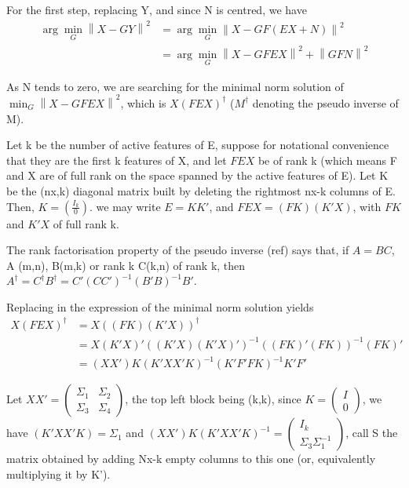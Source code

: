\documentclass{article}
\begin{document}
For the first step, replacing Y, and since N is centred, we have
\begin{equation}
\begin{aligned}
\arg \min_G \left \| X-GY \right \|^2 &= \arg \min_G \left \| X - GF(EX+N)\right\|^2 \\
&{}= \arg \min_G \left \| X-GFEX\right\| ^2  + \left \| GFN\right \| ^2
\end{aligned}
\end{equation}

As N tends to zero, we are searching for the minimal norm solution of $\min_G \left \| X-GFEX\right\| ^2$, which is $X(FEX)^\dagger$ ($M^\dagger$ denoting the pseudo inverse of M).

Let k be the number of active features of E, suppose for notational convenience that they are the first k features of X, and let $FEX$ be of rank k (which means F and X are of full rank on the space spanned by the active features of E). Let K be the (nx,k) diagonal matrix built by deleting the rightmost nx-k columns of E. Then, $K=(\frac{I_{k}}{0})$. we may write $E=KK'$, and $FEX=(FK)(K'X)$, with $FK$  and $K'X$ of full rank k.

The rank factorisation property of the pseudo inverse (ref) says that, if $A=BC$, A (m,n), B(m,k) or rank k C(k,n) of rank k, then $A^\dagger=C^\dagger B^\dagger= C' (CC')^{-1}(B'B)^{-1}B'$.

Replacing in the expression of the minimal norm solution yields
\begin{equation}
\begin{aligned}
X(FEX)^\dagger &=X((FK)(K'X))^\dagger \\
&=X(K'X)'((K'X)(K'X)')^{-1}((FK)'(FK))^{-1}(FK)' \\
&=(XX')K(K'XX'K)^{-1}(K'F'FK)^{-1} K'F' 
\end{aligned}
\end{equation}

Let $XX' = \left(\begin{array}{c|c}\Sigma_{1} & \Sigma_{2} \\\hline \Sigma_{3} & \Sigma_{4}\end{array}\right)$, the top left block being (k,k), since $K=\left(\begin{array}{c}I \\\hline 0\end{array}\right)$, we have $(K'XX'K)=\Sigma_{1}$ and $(XX')K(K'XX'K)^{-1}=\left(\begin{array}{c}I_{k} \\\hline \Sigma_{3} \Sigma_{1}^{-1}\end{array}\right)$, call S the matrix obtained by adding Nx-k empty columns to this one (or, equivalently multiplying it by K').
\end{document}
